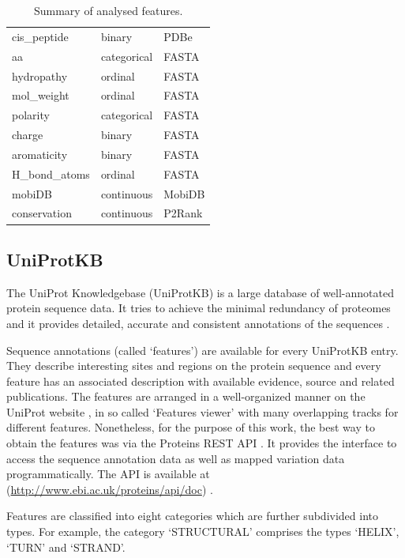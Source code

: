 \begin{table}[]
\begin{tabular}{@{}lll@{}}
cis\_peptide         & binary      & PDBe                  \\
aa                   & categorical & FASTA                 \\
hydropathy           & ordinal     & FASTA                 \\
mol\_weight          & ordinal     & FASTA                 \\
polarity             & categorical & FASTA                 \\
charge               & binary      & FASTA                 \\
aromaticity          & binary      & FASTA                 \\
H\_bond\_atoms       & ordinal     & FASTA                 \\
mobiDB               & continuous  & MobiDB                \\
conservation         & continuous  & P2Rank \\ \bottomrule
\end{tabular}
\caption{Summary of analysed features.}
\label{tab:features}
\end{table}

\subsection{UniProtKB}

The UniProt Knowledgebase (UniProtKB) is a large database of well-annotated protein sequence data. It tries to achieve the minimal redundancy of proteomes and it provides detailed, accurate and consistent annotations of the sequences \cite{uniprot}.

Sequence annotations (called `features') are available for every UniProtKB entry. They describe interesting sites and regions on the protein sequence and every feature has an associated description with available evidence, source and related publications. The features are arranged in a well-organized manner on the UniProt website \cite{uniprot_web}, in so called `Features viewer' with many overlapping tracks for different features. Nonetheless, for the purpose of this work, the best way to obtain the features was via the Proteins REST API \cite{proteins_api}. It provides the interface to  access the sequence annotation data as well as mapped variation data programmatically. The API is available at (\url{http://www.ebi.ac.uk/proteins/api/doc}) \cite{TODO}.

Features are classified into eight categories which are further subdivided into types. For example, the category `STRUCTURAL' comprises the types `HELIX', `TURN' and `STRAND'.

